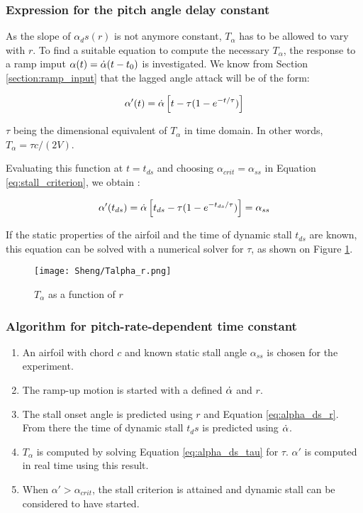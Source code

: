 \subsubsection{Expression for the pitch angle delay constant}
As the slope of $\alpha_ds(r)$ is not anymore constant, $T_\alpha$ has to be allowed to vary with $r$. To find a suitable equation to compute the necessary $T_{\alpha}$, the response to a ramp imput $\alpha(t) = \dot{\alpha}(t-t_0)$ is investigated. 
We know from Section \ref{section:ramp_input} that the lagged angle attack will be of the form:

\begin{equation}
\alpha'(t) = \dot{\alpha}\left[t- \tau(1-e^{-t/ \tau})\right]
\end{equation}

\noindent $\tau$ being the dimensional equivalent of $T_\alpha$ in time domain. In other words, $T_\alpha = \tau c/(2V)$.

Evaluating this function at $t=t_{ds}$ and choosing $\alpha_{crit}=\alpha_{ss}$ in Equation \eqref{eq:stall_criterion}, we obtain : 

\begin{equation}
\alpha'(t_{ds}) = \dot{\alpha}\left[t_{ds} - \tau(1-e^{-t_{ds} / \tau})\right] = \alpha_{ss}
\label{eq:alpha_ds_tau}
\end{equation}

If the static properties of the airfoil and the time of dynamic stall $t_{ds}$ are known, this equation can be solved with a numerical solver for $\tau$, as shown on Figure \ref{fig:Talpha_r}.

\begin{figure}[h]
	\centering
	\texttt{[image: Sheng/Talpha\_r.png]}
	\caption{$T_\alpha$ as a function of $r$}
	\label{fig:Talpha_r}
\end{figure}

\subsubsection{Algorithm for pitch-rate-dependent time constant}

\begin{enumerate}
\item An airfoil with chord $c$ and known static stall angle $\alpha_{ss}$ is chosen for the experiment. 
\item The ramp-up motion is started with a defined $\dot{\alpha}$ and $r$.
\item The stall onset angle is predicted using $r$ and Equation \eqref{eq:alpha_ds_r}. From there the time of dynamic stall $t_ds$ is predicted using $\dot{\alpha}$.
\item $T_\alpha$ is computed by solving Equation  \eqref{eq:alpha_ds_tau} for $\tau$. $\alpha'$ is computed in real time using this result. 
\item When $\alpha' > \alpha_{crit}$, the stall criterion is attained and dynamic stall can be considered to have started. 
\end{enumerate}

